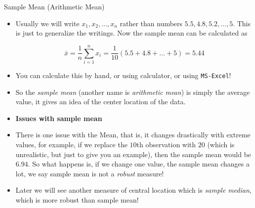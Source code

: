 \documentclass[8pt, usepdftitle=false]{beamer}
\begin{document}

    


\begin{frame}[allowframebreaks]{Sample Mean (Arithmetic Mean)}


\begin{itemize}


\item Usually we will write $x_1, x_2, \ldots, x_n$ rather than numbers $5.5, 4.8, 5.2, \ldots, 5$. This is just to generalize the writings. Now the sample mean can be calculated as 

$$
\bar{x}=\frac{1}{n}\sum_{i = 1}^{n} x_i = \frac{1}{10}(5.5 + 4.8 + \ldots + 5) = 5.44
$$



\item You can calculate this by hand, or using calculator, or using \texttt{MS-Excel}!

\item So the \emph{sample mean} (another name is \emph{arithmetic mean}) is simply the average value, it gives an idea of the center location of the data.

\framebreak

\item[] \textbf{Issues with sample mean}
\medskip
\item There is one issue with the Mean, that is, it changes drastically with \alert{extreme values}, for example, if we replace the $10$th observation with $20$ (which is unrealistic, but just to give you an example), then the sample mean would be $6.94$. So what happens is, if we change one value, the sample mean changes a lot, we say sample mean is not a \emph{robust} measure!

\item Later we will see another measure of central location which is \emph{sample median}, which is more robust than sample mean!

\end{itemize}





\end{frame}
\end{document}
